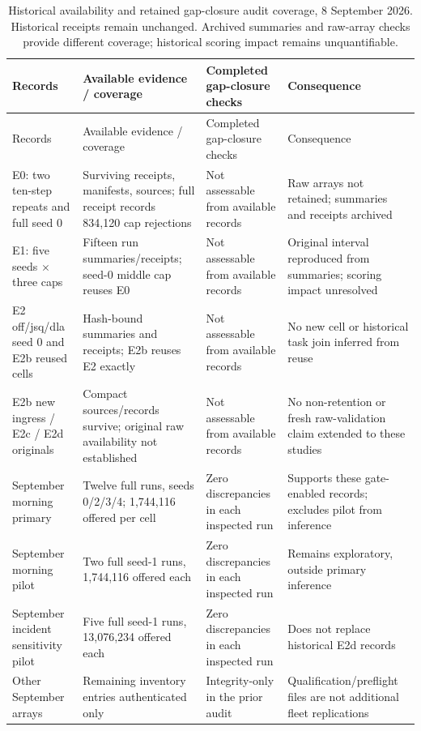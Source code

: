 \documentclass[12pt,a4paper]{article}
\begin{document}
\begingroup
\singlespacing\footnotesize\setlength{\tabcolsep}{3pt}
\renewcommand{\thetable}{B1}
\begin{xltabular}{\textwidth}{@{}YYYY@{}}
\caption[Historical audit coverage]{Historical availability and retained gap-closure audit coverage, 8 September 2026. Historical receipts remain unchanged. Archived summaries and raw-array checks provide different coverage; historical scoring impact remains unquantifiable.}\label{tab:B1} \\
\toprule
Records & Available evidence / coverage & Completed gap-closure checks & Consequence \\
\midrule\endfirsthead
\toprule
Records & Available evidence / coverage & Completed gap-closure checks & Consequence \\
\midrule\endhead
\bottomrule\endfoot
E0: two ten-step repeats and full seed 0 & Surviving receipts, manifests, sources; full receipt records 834,120 cap rejections & Not assessable from available records & Raw arrays not retained; summaries and receipts archived \\
E1: five seeds \ensuremath{\times} three caps & Fifteen run summaries/receipts; seed-0 middle cap reuses E0 & Not assessable from available records & Original interval reproduced from summaries; scoring impact unresolved \\
E2 off/jsq/dla seed 0 and E2b reused cells & Hash-bound summaries and receipts; E2b reuses E2 exactly & Not assessable from available records & No new cell or historical task join inferred from reuse \\
E2b new ingress / E2c / E2d originals & Compact sources/records survive; original raw availability not established & Not assessable from available records & No non-retention or fresh raw-validation claim extended to these studies \\
September morning primary & Twelve full runs, seeds 0/2/3/4; 1,744,116 offered per cell & Zero discrepancies in each inspected run & Supports these gate-enabled records; excludes pilot from inference \\
September morning pilot & Two full seed-1 runs, 1,744,116 offered each & Zero discrepancies in each inspected run & Remains exploratory, outside primary inference \\
September incident sensitivity pilot & Five full seed-1 runs, 13,076,234 offered each & Zero discrepancies in each inspected run & Does not replace historical E2d records \\
Other September arrays & Remaining inventory entries authenticated only & Integrity-only in the prior audit & Qualification/preflight files are not additional fleet replications \\
\end{xltabular}
\endgroup
\end{document}
